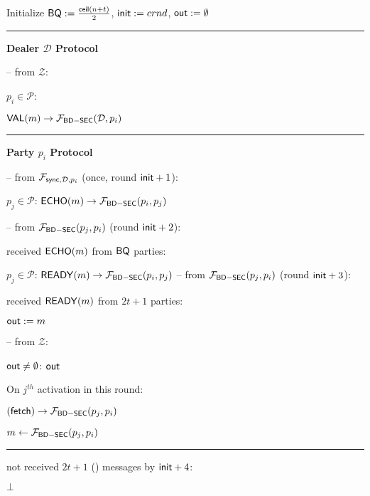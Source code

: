 \begin{bbox}[title={$\Pi_{\msf{Bracha}} (\mathcal{D}, \mathcal{P} = p_1,...,p_n)$ in $\F_{\msf{BD-SEC}}$-hybrid}]

Initialize ${\mathsf {BQ}} := \frac{{\mathsf {ceil}}(n+t)}{2}$, ${\mathsf {init}} := crnd$, ${\mathsf {out}} := \emptyset$

\vspace{2mm} \hrule \vspace{2mm}

{\bf Dealer $\mathcal{D}$ Protocol}

-- \OnInput {} from $\mathcal{Z}$:

	\qquad \For $p_i \in \mathcal{P}$:

		\qquad \quad \Send ${\mathsf {VAL}}(m) \rightarrow \mathcal{F}_{{\mathsf {BD-SEC}}}(\mathcal{D},p_i)$

\vspace{2mm} \hrule \vspace{2mm}

{\bf Party $p_i$ Protocol}

-- \OnInput {} from $\mathcal{F}_{{\mathsf {sync}},\mathcal{D},p_i}$ (once, round ${\mathsf {init}}+1$):

	\qquad \For $p_j \in \mathcal{P}$: \Send ${\mathsf {ECHO}}(m) \rightarrow \mathcal{F}_{{\mathsf {BD-SEC}}}(p_i,p_j)$

-- \OnInput {} from $\mathcal{F}_{{\mathsf {BD-SEC}}}(p_j,p_i)$ (round ${\mathsf {init}}+2$):

	\qquad \If received ${\mathsf {ECHO}}(m)$ from ${\mathsf {BQ}}$ parties:

		\qquad \quad \For $p_j \in \mathcal{P}$: \Send ${\mathsf {READY}}(m) \rightarrow \mathcal{F}_{{\mathsf {BD-SEC}}}(p_i,p_j)$ 
-- \OnInput {} from $\mathcal{F}_{{\mathsf {BD-SEC}}}(p_j,p_i)$ (round ${\mathsf {init}}+3$):

	\qquad \If received ${\mathsf {READY}}(m)$ from $2t+1$ parties:

		\qquad \quad ${\mathsf {out}} := m$

-- \OnInput {} from $\mathcal{Z}$:

	\qquad \If ${\mathsf {out}} \neq \emptyset$: \Output ${\mathsf {out}}$ 

	\qquad \Else On $j^{th}$ activation in this round:

		\qquad \quad \Send $({\mathsf {fetch}}) \rightarrow \mathcal{F}_{{\mathsf {BD-SEC}}}(p_j,p_i)$

		\qquad \quad $m \leftarrow \mathcal{F}_{{\mathsf {BD-SEC}}}(p_j,p_i)$

\vspace{2mm} \hrule \vspace{2mm}

\If not received $2t + 1$ (\textunderscore) messages by ${\mathsf {init}} + 4$:

	\qquad \Output $\bot$

\end{bbox}

